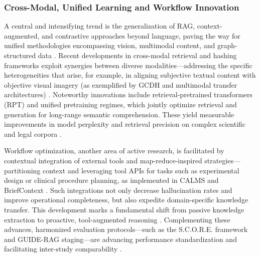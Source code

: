 \subsubsection{Cross-Modal, Unified Learning and Workflow Innovation}

A central and intensifying trend is the generalization of RAG, context-augmented, and contrastive approaches beyond language, paving the way for unified methodologies encompassing vision, multimodal content, and graph-structured data \cite{ref14,ref15,ref20,ref21,ref29,ref30,ref36,ref38,ref54,ref61}. Recent developments in cross-modal retrieval and hashing frameworks exploit synergies between diverse modalities—addressing the specific heterogeneities that arise, for example, in aligning subjective textual content with objective visual imagery (as exemplified by GCDH and multimodal transfer architectures) \cite{ref35,ref38}. Noteworthy innovations include retrieval-pretrained transformers (RPT) and unified pretraining regimes, which jointly optimize retrieval and generation for long-range semantic comprehension. These yield measurable improvements in model perplexity and retrieval precision on complex scientific and legal corpora \cite{ref29,ref31,ref54,ref61}.

Workflow optimization, another area of active research, is facilitated by contextual integration of external tools and map-reduce-inspired strategies—partitioning context and leveraging tool APIs for tasks such as experimental design or clinical procedure planning, as implemented in CALMS and BriefContext \cite{ref5,ref24,ref48}. Such integrations not only decrease hallucination rates and improve operational completeness, but also expedite domain-specific knowledge transfer. This development marks a fundamental shift from passive knowledge extraction to proactive, tool-augmented reasoning \cite{ref28,ref48}. Complementing these advances, harmonized evaluation protocols—such as the S.C.O.R.E. framework and GUIDE-RAG staging—are advancing performance standardization and facilitating inter-study comparability \cite{ref8,ref21,ref28}.

